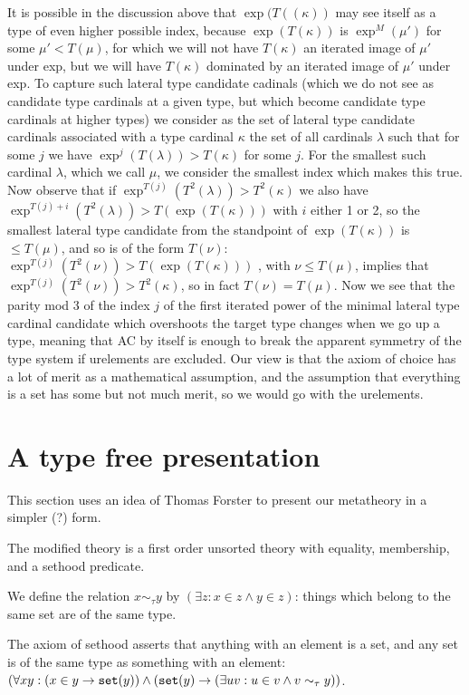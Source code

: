 \documentclass[12pt]{article}
\begin{document}
It is possible in the discussion above that $\exp(T((\kappa))$ may see itself as a type of even higher possible index, because $\exp(T(\kappa))$ is $\exp^M(\mu')$ for some $\mu'<T(\mu)$, for which we will not have $T(\kappa)$ an iterated
image of $\mu'$  under exp, but we will have $T(\kappa)$ dominated by an iterated image of $\mu'$ under exp.  To capture such lateral type candidate cadinals (which we do not see as candidate type cardinals at a given type, but which
become candidate type cardinals at higher types) we consider as the set of lateral type candidate cardinals associated with a type cardinal $\kappa$ the set of all cardinals $\lambda$ such that for some $j$ we have $\exp^j(T(\lambda)) > T(\kappa)$ for some $j$.  For the smallest such cardinal $\lambda$, which we call $\mu$, we consider the smallest index which makes this true.  Now observe that if $\exp^{T(j)}(T^2(\lambda)) > T^2(\kappa)$ we also have $\exp^{T(j)+i}(T^2(\lambda)) > T(\exp(T(\kappa)))$ with $i$ either 1 or 2, so the smallest lateral type candidate from the standpoint of $\exp(T(\kappa))$ is $\leq T(\mu)$, and so is of the form $T(\nu)$:   $\exp^{T(j)}(T^2(\nu)) > T(\exp(T(\kappa)))$ , with $\nu \leq T(\mu)$, implies that $\exp^{T(j)}(T^2(\nu)) > T^2(\kappa)$, so in fact $T(\nu) = T(\mu)$.  Now we see that the parity mod 3 of the index $j$ of the first iterated power of the minimal lateral type cardinal candidate which overshoots the target type changes when we go up a type, meaning that AC by itself is enough to break the apparent symmetry of the type system if urelements are excluded.  Our view is that the axiom of choice has a lot of merit as a mathematical assumption, and the assumption that everything is a set has some but not much merit, so we would go with the urelements.

\section{A type free presentation}

This section uses an idea of Thomas Forster to present our metatheory in a simpler (?) form.

The modified theory is a first order unsorted theory with equality, membership, and a sethood predicate.

We define the relation $x \sim_{\tau} y$ by $(\exists z:x \in z \wedge y \in z)$:  things which belong to the same set are of the same type.

The axiom of sethood asserts that anything with an element is a set, and any set is of the same type as something with an element:  $(\forall xy:(x \in y \rightarrow {\tt set}(y)) \wedge ({\tt set}(y) \rightarrow (\exists uv: u \in v \wedge v \sim_{\tau}y))$.
\end{document}
